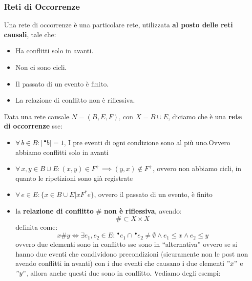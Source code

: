 \subsubsection{Reti di Occorrenze}
Una rete di occorrenze è una particolare rete, utilizzata \textbf{al posto delle reti causali}, tale che:
\begin{itemize}
    \item Ha conflitti solo in avanti.
    \item Non ci sono cicli.
    \item Il passato di un
evento è finito.
    \item La relazione di conflitto non è riflessiva.
\end{itemize}
\begin{definizione}
  Data una rete causale $N=(B, E, F)$, con $X=B\cup E$, diciamo che è una
  \textbf{rete di occorrenze} sse:
  \begin{itemize}
    \item $\forall\, b\in B:|\,^\bullet b|=1$, I pre eventi di ogni condizione sono al più uno.Ovvero abbiamo conflitti solo in
    avanti
    \item $\forall\, x, y\in B\cup E:(x, y)\in F^+\implies (y, x)\not\in F^+$,
    ovvero non abbiamo cicli, in quanto le ripetizioni sono già registrate
    \item $\forall\, e\in E:\{x\in B\cup E|xF^*e\}$, ovvero il passato di un
    evento, è finito 
    \item la \textbf{relazione di conflitto} $\#$ \textbf{non è riflessiva}, avendo:
    \[\#\subset X\times X\]
    definita come:
    \[x\# y\iff \exists e_1, e_2\in E:\,^\bullet e_1\cap \,^\bullet e_2\neq
      \emptyset \land e_1\leq x\land e_2\leq y\]
    ovvero due elementi sono in conflitto sse sono in ``alternativa'' ovvero se
    si hanno due eventi che condividono precondizioni (sicuramente non le post
    non avendo conflitti in avanti) con i due eventi che causano i due elementi
    $"x"$ e $"y"$, allora anche questi due sono in conflitto. Vediamo degli esempi:
    \begin{figure}[H]
      \centering
\end{figure}
\end{itemize}
\end{definizione}
